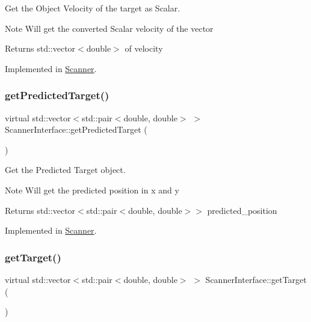 Get the Object Velocity of the target as Scalar. 

\begin{DoxyNote}{Note}
Will get the converted Scalar velocity of the vector 
\end{DoxyNote}
\begin{DoxyReturn}{Returns}
std\+::vector$<$double$>$ of velocity 
\end{DoxyReturn}


Implemented in \hyperlink{classScanner_ac9b03f1f8b6f38f6f8144affa6be9854}{Scanner}.

\mbox{\label{classScannerInterface_a27f991c8667a4c2524580addd264ae70}} 
\subsubsection{\texorpdfstring{get\+Predicted\+Target()}{getPredictedTarget()}}
{\footnotesize\ttfamily virtual std\+::vector$<$std\+::pair$<$double, double$>$ $>$ Scanner\+Interface\+::get\+Predicted\+Target (\begin{DoxyParamCaption}{ }\end{DoxyParamCaption})\hspace{0.3cm}{\ttfamily [pure virtual]}}



Get the Predicted Target object. 

\begin{DoxyNote}{Note}
Will get the predicted position in x and y 
\end{DoxyNote}
\begin{DoxyReturn}{Returns}
std\+::vector$<$std\+::pair$<$double, double$>$$>$ predicted\+\_\+position 
\end{DoxyReturn}


Implemented in \hyperlink{classScanner_a4f9ba72b2339cad7e3cb7ffe46196ea2}{Scanner}.

\mbox{\label{classScannerInterface_a526bd963b27ac01be5844bfcb9ecdb27}} 
\subsubsection{\texorpdfstring{get\+Target()}{getTarget()}}
{\footnotesize\ttfamily virtual std\+::vector$<$std\+::pair$<$double, double$>$ $>$ Scanner\+Interface\+::get\+Target (\begin{DoxyParamCaption}{ }\end{DoxyParamCaption})\hspace{0.3cm}{\ttfamily [pure virtual]}}



